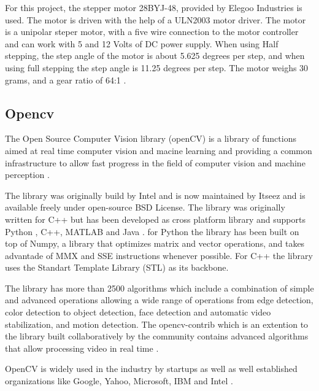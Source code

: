 \documentclass[sigconf]{acmart}
\begin{document}
For this project, the stepper motor 28BYJ-48, provided by Elegoo Industries is used. The motor is driven with the help of a ULN2003 motor driver. The motor is a unipolar steper motor, with a five wire connection to the motor controller and can work with 5 and 12 Volts of DC power supply. When using Half stepping, the step angle of the motor is about 5.625 degrees per step, and when using full stepping the step angle is 11.25 degrees per step.
The motor weighs 30 grams, and a gear ratio of 64:1 \cite{elegoo}\cite{elegoo-desc}.

\subsection{Opencv}

The Open Source Computer Vision library (openCV) is a library of functions aimed at real time computer vision and macine learning and providing a common infrastructure to allow fast progress in the field of computer vision and machine perception \cite{opencv-wiki}\cite{official-opencv}.

The library was originally build by Intel and is now maintained by Itseez and is available freely under open-source BSD License. The library was originally written for C++ but has been developed as cross platform library and supports Python , C++, MATLAB and Java \cite{official-opencv}. for Python the library has been built on top of Numpy, a library that optimizes matrix and vector operations, and takes advantade of MMX and SSE instructions whenever possible. For C++ the library uses the Standart Template Library (STL) as its backbone.

The library has more than 2500 algorithms which include a combination of simple and advanced operations allowing a wide range of operations from edge detection, color detection to object detection, face detection and automatic video stabilization, and motion detection. The opencv-contrib which is an extention to the library built collaboratively by the community contains advanced algorithms that allow processing video in real time \cite{official-opencv}.

OpenCV is widely used in the industry by startups as well as well established organizations like Google, Yahoo, Microsoft, IBM and Intel \cite{official-opencv}.
\end{document}
